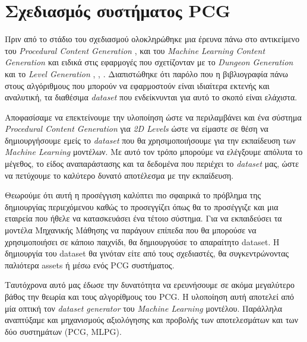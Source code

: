 \section{Σχεδιασμός συστήματος PCG}
Πριν από το στάδιο του σχεδιασμού ολοκληρώθηκε μια έρευνα πάνω στο αντικείμενο του \textit{Procedural Content Generation} \cite{answersetforpcg} \cite{constrainedsearchpcg} \cite{surrogate}, \cite{roguedream} και του  \textit{Machine Learning Content Generation \cite{mlpcg}} και ειδικά στις εφαρμογές που σχετίζονταν με το \textit{Dungeon Generation} και το \textit{Level Generation} \cite{cellular}, \cite{missions}, \cite{platform}. Διαπιστώθηκε ότι παρόλο που η βιβλιογραφία πάνω στους αλγόριθμους που μπορούν να εφαρμοστούν είναι ιδιαίτερα εκτενής και αναλυτική, τα διαθέσιμα \textit{dataset} που ενδείκνυνται για αυτό το σκοπό είναι ελάχιστα.
\par
Αποφασίσαμε να επεκτείνουμε την υλοποίηση ώστε να περιλαμβάνει και ένα σύστημα \textit{Procedural Content Generation} για \textit{2D Levels} ώστε να είμαστε σε θέση να δημιουργήσουμε εμείς το \textit{dataset} που θα χρησιμοποιήσουμε για την εκπαίδευση των \textit{Machine Learning} μοντέλων. Με αυτό τον τρόπο μπορούμε να ελέγξουμε απόλυτα το μέγεθος, το είδος αναπαράστασης και τα δεδομένα που περιέχει το \textit{dataset} μας, ώστε να πετύχουμε το καλύτερο δυνατό αποτέλεσμα με την εκπαίδευση.
\par
Θεωρούμε ότι αυτή η προσέγγιση καλύπτει πιο σφαιρικά το πρόβλημα της δημιουργίας περιεχόμενου καθώς το προσεγγίζει όπως θα το προσέγγιζε και μια εταιρεία που ήθελε να κατασκευάσει ένα τέτοιο σύστημα. Για να εκπαιδεύσει τα μοντέλα Μηχανικής Μάθησης να παράγουν επίπεδα που θα μπορούσε να χρησιμοποιήσει σε κάποιο παιχνίδι, θα δημιουργούσε το απαραίτητο dataset. Η δημιουργία του dataset θα γινόταν είτε από τους σχεδιαστές, θα συγκεντρώνοντας παλιότερα assets ή μέσω ενός PCG συστήματος.
\par
Ταυτόχρονα αυτό μας έδωσε την δυνατότητα να ερευνήσουμε σε ακόμα μεγαλύτερο βάθος την θεωρία και τους αλγορίθμους του PCG. Η υλοποίηση αυτή αποτελεί από μία οπτική τον \textit{dataset generator} του \textit{Machine Learning} μοντέλου. Παράλληλα αναπτύξαμε και μηχανισμούς αξιολόγησης και προβολής των αποτελεσμάτων και των δύο συστημάτων (PCG, MLPG).


